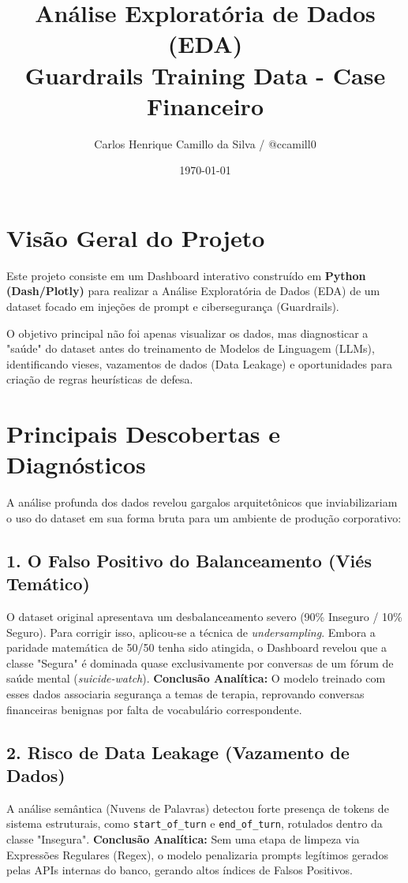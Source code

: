 \documentclass[12pt,a4paper]{article}
\title{\textbf{Análise Exploratória de Dados (EDA) \\ \Large Guardrails Training Data - Case Financeiro}}
\author{Carlos Henrique Camillo da Silva / @ccamill0}
\date{\today}
\begin{document}
\maketitle

\section*{Visão Geral do Projeto}
Este projeto consiste em um Dashboard interativo construído em \textbf{Python (Dash/Plotly)} para realizar a Análise Exploratória de Dados (EDA) de um dataset focado em injeções de prompt e cibersegurança (Guardrails). 

O objetivo principal não foi apenas visualizar os dados, mas diagnosticar a "saúde" do dataset antes do treinamento de Modelos de Linguagem (LLMs), identificando vieses, vazamentos de dados (Data Leakage) e oportunidades para criação de regras heurísticas de defesa.

\section{Principais Descobertas e Diagnósticos}
A análise profunda dos dados revelou gargalos arquitetônicos que inviabilizariam o uso do dataset em sua forma bruta para um ambiente de produção corporativo:

\subsection{1. O Falso Positivo do Balanceamento (Viés Temático)}
O dataset original apresentava um desbalanceamento severo (90\% Inseguro / 10\% Seguro). Para corrigir isso, aplicou-se a técnica de \textit{undersampling}. Embora a paridade matemática de 50/50 tenha sido atingida, o Dashboard revelou que a classe "Segura" é dominada quase exclusivamente por conversas de um fórum de saúde mental (\textit{suicide-watch}). 
\textbf{Conclusão Analítica:} O modelo treinado com esses dados associaria segurança a temas de terapia, reprovando conversas financeiras benignas por falta de vocabulário correspondente.

\subsection{2. Risco de Data Leakage (Vazamento de Dados)}
A análise semântica (Nuvens de Palavras) detectou forte presença de tokens de sistema estruturais, como \texttt{start\_of\_turn} e \texttt{end\_of\_turn}, rotulados dentro da classe "Insegura".
\textbf{Conclusão Analítica:} Sem uma etapa de limpeza via Expressões Regulares (Regex), o modelo penalizaria prompts legítimos gerados pelas APIs internas do banco, gerando altos índices de Falsos Positivos.
\end{document}
